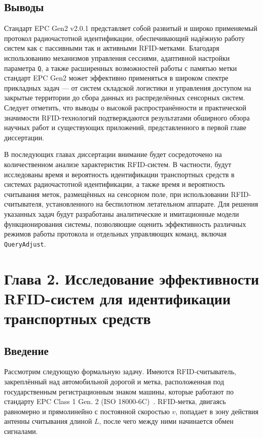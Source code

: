 \documentclass[12pt]{article}
\theoremstyle{definition}
\begin{document}
\subsection*{Выводы}

Стандарт EPC Gen2 v2.0.1 представляет собой развитый и широко применяемый протокол радиочастотной идентификации, обеспечивающий надёжную работу систем как с пассивными так и активными RFID-метками. Благодаря использованию механизмов управления сессиями, адаптивной настройки параметра \texttt{Q}, а также расширенных возможностей работы с памятью метки стандарт EPC Gen2 может эффективно применяться в широком спектре прикладных задач — от систем складской логистики и управления доступом на закрытые территории до сбора данных из распределённых сенсорных систем. Следует отметить, что выводы о высокой распространённости и практической значимости RFID-технологий подтверждаются результатами обширного обзора научных работ и существующих приложений, представленного в первой главе диссертации.

В последующих главах диссертации внимание будет сосредоточено на количественном анализе характеристик RFID-систем. В частности, будут исследованы время и вероятность идентификации транспортных средств в системах радиочастотной идентификации, а также время и вероятность считывания меток, размещённых на сенсорном поле, при использовании RFID-считывателя, установленного на беспилотном летательном аппарате. Для решения указанных задач будут разработаны аналитические и имитационные модели функционирования системы, позволяющие оценить эффективность различных режимов работы протокола и отдельных управляющих команд, включая \texttt{QueryAdjust}.

\pagebreak

\section{Глава 2. Исследование эффективности RFID-систем для идентификации транспортных средств}
\label{sec:ch2}

\subsection{Введение}
\label{sec:ch21}

Рассмотрим следующую формальную задачу. Имеются RFID-считыватель, закреплённый над автомобильной дорогой и метка, расположенная под государственным регистрационным знаком машины, которые работают по стандарту EPC Class 1 Gen. 2 (ISO 18000-6C)~\cite{StdGen2}. RFID-метка, двигаясь равномерно и прямолинейно с постоянной скоростью $v$, попадает в зону действия антенны считывания длиной $L$, после чего между ними начинается обмен сигналами.
\end{document}
